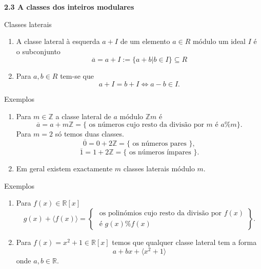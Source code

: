 \documentclass{beamer}
\newcommand{\ZZ}{\mathbb Z}
\newcommand{\RR}{\mathbb R}
\begin{document}
 
\begin{frame}{\bf 2.3 A classes dos inteiros modulares}
\begin{block}{Classes laterais}
\begin{enumerate}
\item A classe lateral à esquerda $a+I$ de um elemento $a\in R$ módulo um ideal $I$ é o subconjunto 
 $$ \overline{a}=a + I := \{ a + b | b\in I\} \subseteq R$$ \pause
 \item Para $a,b \in R$ tem-se que 
 $$a+I = b+I \Leftrightarrow a-b \in I.$$
 \end{enumerate}
 \end{block}
 \end{frame}
 
 \begin{frame}{}
 \begin{block}{Exemplos}
 \begin{enumerate}
  \item Para $m\in \ZZ$ a classe lateral de $a$ módulo $\ZZ m$ é 
  $$\overline{a}=a + m\ZZ  = \{\mbox{ os números cujo resto da divisão por $m$ é $a\% m$}\}.$$\pause
  Para $m=2$ só temos duas classes.
  $$ \overline{0}=0 + 2\ZZ = \{ \mbox { os números pares }\},$$
  $$ \overline{1}=1 + 2\ZZ = \{ \mbox { os números ímpares }\}.$$\pause
  \item Em geral existem exactamente $m$ classes laterais módulo $m$.

 \end{enumerate}
\end{block}
\end{frame}

 \begin{frame}{}
 \begin{block}{Exemplos}
 \begin{enumerate}
  \item Para $f(x) \in \RR[x]$ 
    $$g(x) + \langle f(x) \rangle  = \left\{ 
    \begin{array}{l} \mbox{ os polinómios cujo resto da divisão por $f(x)$}\\ \mbox{ é $g(x)\% f(x)$} \end{array} \right\}.$$\pause
  \item Para $f(x)=x^2+1\in \RR[x]$ temos que qualquer classe lateral tem a forma
  $$ a + bx + \langle x^2+1\rangle $$
  onde $a,b \in \RR$.
  
 \end{enumerate}
 \end{block}
 \end{frame}
\end{document}
